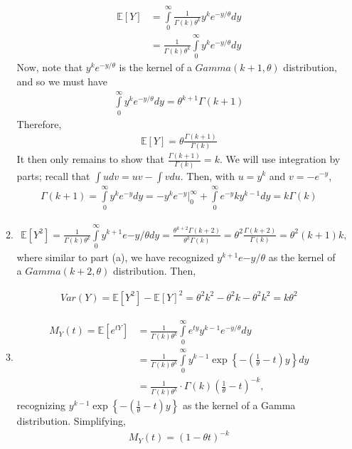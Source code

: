 \documentclass[12pt]{article}
\begin{document}
\begin{enumerate}
\begin{enumerate}
\begin{align*}
\mathbb{E}[Y] &= \int \limits_0^\infty \frac{1}{\Gamma(k) \theta^k} y^k e^{-y/\theta} dy \\
&= \frac{1}{\Gamma(k) \theta^k} \int \limits_0^\infty y^k e^{-y/\theta} dy
\end{align*}
Now, note that $y^k e^{-y/\theta}$ is the kernel of a $Gamma(k+1, \theta)$ distribution, and so we must have
\begin{align*}
\int \limits_0^\infty y^k e^{-y/\theta} dy = \theta^{k+1} \Gamma(k+1)
\end{align*}
Therefore,
\begin{align*}
\mathbb{E}[Y] = \theta \frac{\Gamma(k+1)}{\Gamma(k)}
\end{align*}
It then only remains to show that $\frac{\Gamma(k+1)}{\Gamma(k)} = k$. We will use integration by parts; recall that $\int u dv = uv - \int v du$. Then, with $u = y^k$ and $v = -e^{-y}$,
\begin{align*}
\Gamma(k+1) = \int \limits_0^\infty y^k e^{-y} dy = -y^k e^{-y} \biggr\lvert_0^\infty + \int \limits_0^\infty e^{-y} ky^{k-1} dy = k \Gamma(k)
\end{align*}

\item 

\begin{align*}
\mathbb{E}[Y^2] = \frac{1}{\Gamma(k)\theta^k} \int \limits_0^\infty y^{k+1} e{-y/\theta} dy = \frac{\theta^{k+2} \Gamma(k+2)}{\theta^k \Gamma(k)} = \theta^2 \frac{\Gamma(k+2)}{\Gamma(k)} = \theta^2 (k+1)k,
\end{align*}
where similar to part (a), we have recognized $y^{k+1} e{-y/\theta}$ as the kernel of a $Gamma(k+2, \theta)$ distribution. Then,

\begin{align*}
Var(Y) = \mathbb{E}[Y^2] - \mathbb{E}[Y]^2 = \theta^2k^2 - \theta^2k - \theta^2k^2 = k\theta^2
\end{align*}

\item 

\begin{align*}
M_Y(t) = \mathbb{E}[e^{tY}] &= \frac{1}{\Gamma(k) \theta^k} \int \limits_0^\infty e^{ty} y^{k-1} e^{-y/\theta} dy \\
&= \frac{1}{\Gamma(k) \theta^k} \int \limits_0^\infty y^{k-1} \exp\left\lbrace -\left(\frac{1}{\theta} - t\right)y \right\rbrace dy \\
&= \frac{1}{\Gamma(k) \theta^k} \cdot \Gamma(k) \left(\frac{1}{\theta} - t\right)^{-k},
\end{align*}
recognizing $y^{k-1} \exp\left\lbrace -\left(\frac{1}{\theta} - t\right)y \right\rbrace$ as the kernel of a Gamma distribution. Simplifying,
\begin{align*}
M_Y(t) = (1 - \theta t)^{-k}
\end{align*}


\end{enumerate}
\end{enumerate}
\end{document}
